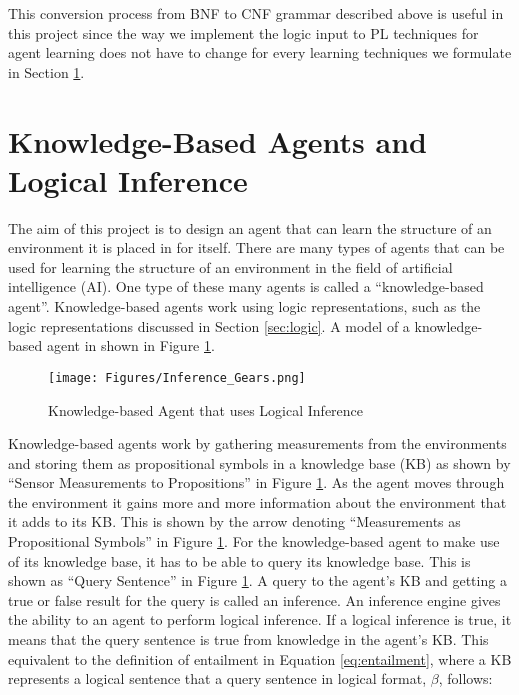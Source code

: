 This conversion process from BNF to CNF grammar described above is useful in this project since the way we implement the logic input to PL techniques for agent learning does not have to change for every learning techniques we formulate in Section \ref{sec:kb_agents_and_logical_inference}.



\newpage

\section{Knowledge-Based Agents and Logical Inference}
\label{sec:kb_agents_and_logical_inference}

The aim of this project is to design an agent that can learn the structure of an environment it is placed in for itself. There are many types of agents that can be used for learning the structure of an environment in the field of artificial intelligence (AI). One type of these many agents is called a ``knowledge-based agent''. 
Knowledge-based agents work using logic representations, such as the logic representations discussed in Section \ref{sec:logic}.
A model of a knowledge-based agent in shown in Figure \ref{fig:kb_agent}. 

\begin{figure}[H]
    \centering
    \texttt{[image: Figures/Inference\_Gears.png]}
    \caption{Knowledge-based Agent that uses Logical Inference}
    \label{fig:kb_agent}
\end{figure}




Knowledge-based agents work by gathering measurements from the environments and storing them as propositional symbols in a knowledge base (KB) as shown by ``Sensor Measurements to Propositions'' in Figure \ref{fig:kb_agent}. As the agent moves through the environment it gains more and more information about the environment that it adds to its KB. This is shown by the arrow denoting ``Measurements as Propositional Symbols'' in Figure \ref{fig:kb_agent}. For the knowledge-based agent to make use of its knowledge base, it has to be able to query its knowledge base. This is shown as ``Query Sentence'' in Figure \ref{fig:kb_agent}. A query to the agent's KB and getting a true or false result for the query is called an inference. An inference engine gives the ability to an agent to perform logical inference. If a logical inference is true, it means that the query sentence is true from knowledge in the agent's KB. This equivalent to the definition of entailment in Equation \ref{eq:entailment}, where a KB represents a logical sentence that a query sentence in logical format, $\beta$, follows:


